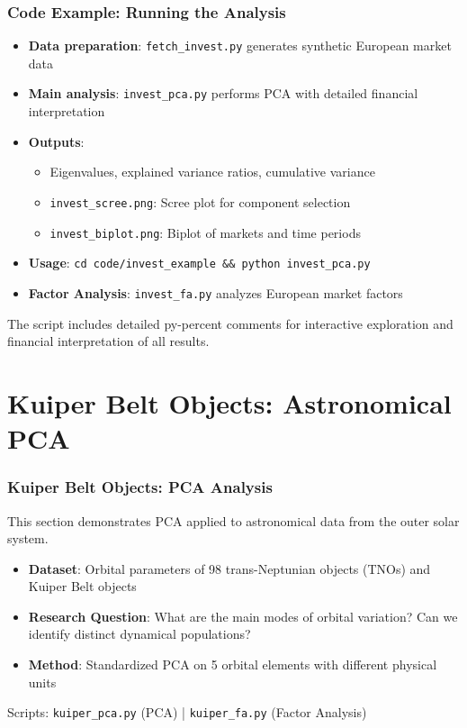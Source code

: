 \documentclass[aspectratio=169]{beamer}
\begin{document}
\begin{frame}
    \frametitle{Code Example: Running the Analysis}
    \begin{itemize}
        \item \textbf{Data preparation}: \texttt{fetch\_invest.py} generates synthetic European market data \pause
        \item \textbf{Main analysis}: \texttt{invest\_pca.py} performs PCA with detailed financial interpretation \pause
        \item \textbf{Outputs}: 
              \begin{itemize}
                  \item Eigenvalues, explained variance ratios, cumulative variance \pause
                  \item \texttt{invest\_scree.png}: Scree plot for component selection \pause
                  \item \texttt{invest\_biplot.png}: Biplot of markets and time periods \pause
              \end{itemize}
        \item \textbf{Usage}: \texttt{cd code/invest\_example \&\& python invest\_pca.py} \pause
        \item \textbf{Factor Analysis}: \texttt{invest\_fa.py} analyzes European market factors \pause
    \end{itemize}
    \vspace{6pt}
    The script includes detailed py-percent comments for interactive exploration and financial interpretation of all results.
\end{frame}

\section{Kuiper Belt Objects: Astronomical PCA}

\begin{frame}
    \frametitle{Kuiper Belt Objects: PCA Analysis}
    This section demonstrates PCA applied to astronomical data from the outer solar system.
    \begin{itemize}
        \item \textbf{Dataset}: Orbital parameters of 98 trans-Neptunian objects (TNOs) and Kuiper Belt objects \pause
        \item \textbf{Research Question}: What are the main modes of orbital variation? Can we identify distinct dynamical populations? \pause
        \item \textbf{Method}: Standardized PCA on 5 orbital elements with different physical units \pause
    \end{itemize}
    \vspace{6pt}
    Scripts: \texttt{kuiper\_pca.py} (PCA) | \texttt{kuiper\_fa.py} (Factor Analysis)
\end{frame}
\end{document}
